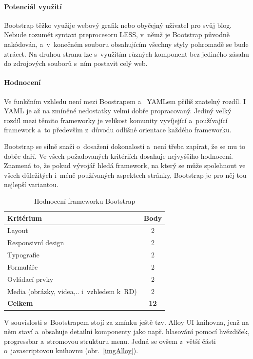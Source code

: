 \documentclass[thesis=B,czech]{FITthesis}[2012/06/26]
\begin{document}
\paragraph{Potenciál využití}

 Bootstrap těžko využije webový grafik nebo obyčejný uživatel pro svůj blog. Nebude rozumět syntaxi preprocesoru LESS, v~němž je Bootstrap původně nakódován, a~v~konečném souboru obsahujícím všechny styly pohromadě se bude ztrácet. Na druhou stranu lze s~využitím různých komponent bez jediného zásahu do zdrojových souborů s~ním postavit celý web. 

\paragraph{Hodnocení}

Ve funkčním vzhledu není mezi Boostrapem a~ \gls{YAML}em příliš znatelný rozdíl. I \gls{YAML} je až na zmíněné nedostatky velmi dobře propracovaný. Jediný velký rozdíl mezi těmito frameworky je velikost komunity vyvíjející a~používající framework a~to především z~důvodu odlišné orientace každého frameworku.

Bootstrap se silně snaží o~dosažení dokonalosti a~není třeba zapírat, že se mu to dobře daří. Ve všech požadovaných kritériích dosahuje nejvyššího hodnocení. Znamená to, že pokud vývojář hledá framework, na který se může spolehnout ve všech důležitých i~méně používaných aspektech stránky, Bootstrap je pro něj tou nejlepší variantou.



\begin{table}[h]\centering
 	\caption[Hodnocení Bootstrapu]{Hodnocení frameworku Bootstrap}\label{tab:bootstrap}
 	\begin{tabular}{|l|c|}\hline
 	\textbf{Kritérium} & \textbf{Body}\tabularnewline
 	\hline\hline
		Layout & 2\tabularnewline
		\hline 
		 Responsivní design & 2\tabularnewline
		\hline 
		Typografie & 2\tabularnewline
		\hline 
		Formuláře & 2\tabularnewline
		\hline 
		Ovládací prvky & 2\tabularnewline
		\hline 
		Media  (obrázky, videa,.. i~vzhledem k~RD) & 2\tabularnewline
		\hline 
		\textbf{Celkem} & \textbf{12}\tabularnewline
		\hline 
 	\end{tabular}
\end{table} 

V souvislosti s~Bootstrapem stojí za zmínku ještě tzv. Alloy UI knihovna, jenž na něm staví a~obsahuje detailní komponenty jako např. hlasování pomocí hvězdiček, progressbar a~stromovou strukturu menu. Jedná se ovšem z~větší části o~javascriptovou knihovnu (obr.~\ref{imgAlloy}).
\end{document}
